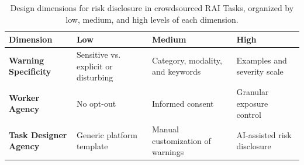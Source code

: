 \begin{table}[t]
\fontsize{7pt}{10pt}\selectfont
\centering
\begin{tabular}{p{3cm} p{4cm} p{4cm} p{4cm}}
\toprule
\textbf{Dimension} & \textbf{Low} & \textbf{Medium} & \textbf{High} \\
\midrule
\textbf{Warning Specificity} & 
Sensitive vs. explicit or disturbing ~\cite{prolific2025sensitive, bell2025warning} & 
Category, modality, and keywords ~\cite{jhaver2023personalizing, bridgland2024meta} & 
Examples and severity scale ~\cite{jhaver2023personalizing}\\
\midrule
\textbf{Worker Agency} & 
No opt-out ~\cite{MTurkTutorial2017} &
Informed consent ~\cite{silberman2018responsible, ProlificParticipantSensitive2025} & 
Granular exposure control ~\cite{jhaver2023personalizing, jhaver2022designing} \\
\midrule

\textbf{Task Designer Agency} & 
Generic platform template ~\cite{prolific2025sensitive, ProlificAPIContentWarning2025} & 
Manual customization of warnings ~\cite{qian2025locating}& 
AI-assisted risk disclosure ~\cite{qian2025aura} \\
\bottomrule
\end{tabular}
\caption{Design dimensions for risk disclosure in crowdsourced RAI Tasks, organized by low, medium, and high levels of each dimension.}
\label{tab:design_dimensions_levels}
\end{table}

\subsubsection{}

